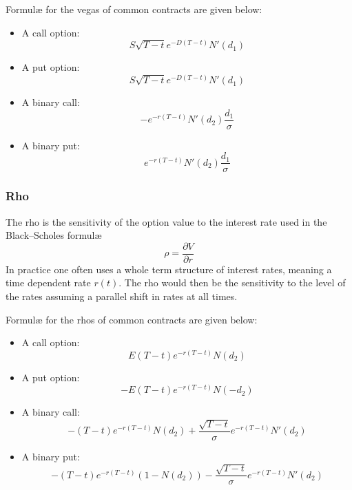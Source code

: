 Formul{\ae} for the vegas of common contracts are given below:
\begin{itemize}
	\setlength\itemsep{0em}
	\item A call option:
	\begin{equation}
		S \sqrt{T-t} e^{-D(T-t)} N'(d_1)
	\end{equation}
	\item A put option:
	\begin{equation}
		S \sqrt{T-t} e^{-D(T-t)} N'(d_1)
	\end{equation}
	\item A binary call:
	\begin{equation}
		-e^{-r(T-t)} N'(d_2) \frac{d_1}{\sigma}
	\end{equation}
	\item A binary put:
	\begin{equation}
	 	e^{-r(T-t)} N'(d_2) \frac{d_1}{\sigma}
	\end{equation}
\end{itemize}


\subsubsection{Rho}
The rho is the sensitivity of the option value to the interest rate used in the Black–Scholes formul{\ae}
\begin{equation}
    \rho = \frac{\partial V}{\partial r}
\end{equation}
In practice one often uses a whole term structure of interest rates, meaning a time dependent rate $r(t)$. The rho would then be the sensitivity to the level of the rates assuming a parallel shift in rates at all times.

Formul{\ae} for the rhos of common contracts are given below:
\begin{itemize}
	\setlength\itemsep{0em}
	\item A call option:
	\begin{equation}
		E (T-t) e^{-r(T-t)} N(d_2)
	\end{equation}
	\item A put option:
	\begin{equation}
		-E (T-t) e^{-r(T-t)} N(-d_2)
	\end{equation}
	\item A binary call:
	\begin{equation}
		-(T-t) e^{-r(T-t)} N(d_2) + \frac{\sqrt{T-t}}{\sigma} e^{-r(T-t)} N'(d_2)
	\end{equation}
	\item A binary put:
	\begin{equation}
	 	-(T-t) e^{-r(T-t)} \left( 1 - N(d_2) \right) - \frac{\sqrt{T-t}}{\sigma} e^{-r(T-t)} N'(d_2)
	\end{equation}
\end{itemize}

